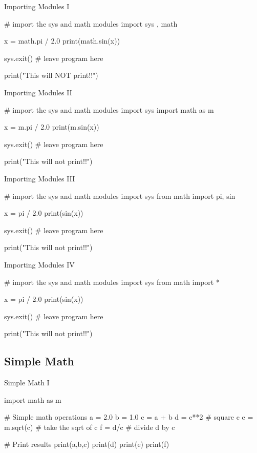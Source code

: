\documentclass[11pt]{beamer}
\begin{document}
\begin{frame}[fragile]{Importing Modules I}
\begin{semiverbatim}
# import the sys and math modules
import sys , math

x = math.pi / 2.0 
print(math.sin(x))

sys.exit()       # leave program here 

print("This will NOT print!!")

\end{semiverbatim}
\end{frame}


\begin{frame}[fragile]{Importing Modules II}
\begin{semiverbatim}
# import the sys and math modules
import sys 
import math as m

x = m.pi / 2.0 
print(m.sin(x))

sys.exit()       # leave program here 

print("This will not print!!")

\end{semiverbatim}
\end{frame}

\begin{frame}[fragile]{Importing Modules III}
\begin{semiverbatim}
# import the sys and math modules
import sys 
from math import pi, sin

x = pi / 2.0 
print(sin(x))

sys.exit()       # leave program here 

print("This will not print!!")

\end{semiverbatim}
\end{frame}

\begin{frame}[fragile]{Importing Modules IV}
\begin{semiverbatim}
# import the sys and math modules
import sys 
from math import * 

x = pi / 2.0 
print(sin(x))

sys.exit()       # leave program here 

print("This will not print!!")

\end{semiverbatim}
\end{frame}


\subsection{Simple Math}
\begin{frame}[fragile]{Simple Math I}
\small
\begin{semiverbatim}
import math as m

# Simple math operations
a = 2.0
b = 1.0
c = a + b
d = c**2 		# square c
e = m.sqrt(c) 	# take the sqrt of c 
f = d/c 		# divide d by c

# Print results 
print(a,b,c) 
print(d)
print(e)
print(f)
\end{semiverbatim}
\end{frame}
\end{document}
